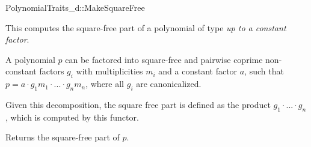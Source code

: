\begin{ccRefConcept}{PolynomialTraits_d::MakeSquareFree}
\ccDefinition

This  computes the square-free part of 
a polynomial of type   
{\em up to a constant factor}.  

A polynomial $p$ can be  factored into square-free and pairwise coprime 
non-constant factors $g_i$ with multiplicities $m_i$ and a constant factor $a$, 
such that $p = a  \cdot  g_1m_1  \cdot  ...  \cdot  g_nm_n$, where all $g_i$ are canonicalized.

Given this decomposition, the square free part is defined as the product $g_1  \cdot  ...  \cdot  g_n$, 
which is computed by this functor. 

\ccRefines 
{}

\ccTypes

\ccGlue
{}

\ccOperations
{}
         { Returns the square-free part of $p$.}



\ccSeeAlso

\\
\\
\\

\end{ccRefConcept}
